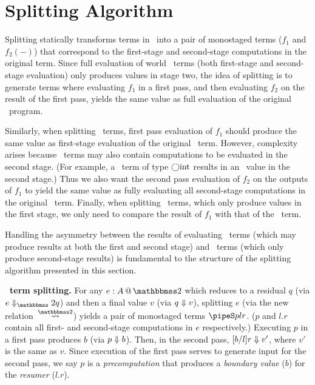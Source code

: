 
\section{Splitting Algorithm}
\label{sec:splitting}

%

\begin{abstrsyn}

Splitting statically transforms terms in \lang\ into a pair of
monostaged terms ($f_1$ and $f_2(-)$) that correspond to the first-stage 
and second-stage computations in the original term. Since full
evaluation of world \bbtwo\ terms (both first-stage and second-stage
evaluation) only produces values in stage two, the idea of splitting
is to generate terms where evaluating $f_1$ in a first pass, and then
evaluating $f_2$ on the result of the first pass, yields the same
value as full evaluation of the original \lang\ program.

Similarly, when splitting \bbonem\ terms, first pass evaluation of
$f_1$ should produce the same value as first-stage evaluation of the
original \lang\ term.  However, complexity arises because
\bbonem\ terms may also contain computations to be evaluated in the
second stage. (For example, a \bbonem\ term of type $\bigcirc {\rm int}$
results in an \rmint\ value in the second stage.) Thus we also want
the second pass evaluation of $f_2$ on the outputs of $f_1$ to yield
the same value as fully evaluating all second-stage computations in
the original \bbonem\ term. Finally, when splitting \bbonep\ terms,
which only produce values in the first stage, we only need to compare
the result of $f_1$ with that of the \lang\ term.

Handling the asymmetry between the results of evaluating
\bbonem\ terms (which may produce results at both the first and second
stage) and \bbtwo\ terms (which only produce second-stage results) is
fundamental to the structure of the splitting algorithm presented in
this section.

\textbf{\bbtwo\ term splitting.}  For any $\coltwo e A$ which reduces
to a residual $q$ (via $\diatwo e q$) and then a final value $v$ (via
${q} \Downarrow {v}$), splitting $e$ (via the new relation~$\splittwosym$)
yields a pair of monostaged terms $\pipeS p l r$. ($p$ and $l.r$
contain all first- and second-stage computations in $e$ respectively.)
Executing $p$ in a first pass produces $b$ (via ${p} \Downarrow {b}$). Then,
in the second pass, ${[b/l]r} \Downarrow {v'}$, where $v'$ is the same as
$v$.  Since execution of the first pass serves to generate input for
the second pass, we say $p$ is a {\em precomputation} that produces a
{\em boundary value} ($b$) for the {\em resumer} ($l.r$).


\end{abstrsyn}
